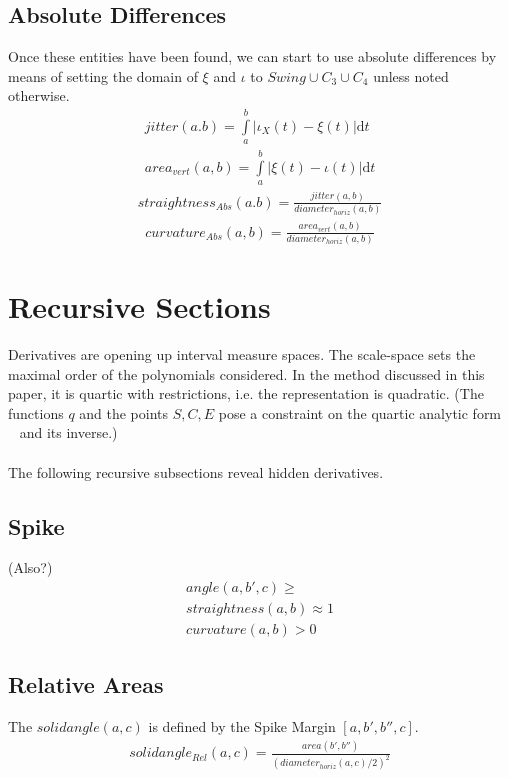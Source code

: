 \documentclass{report}
\begin{document}
\subsection*{Absolute Differences}
Once these entities have been found, we can start to use absolute differences by means of setting the domain of $\xi$ and $\iota$ to $Swing \cup C_{3} \cup C_{4}$ unless noted otherwise.
\begin{align}
jitter(a.b)=\int \limits _{a}^{b}\lvert \iota_{X}(t) - \xi(t) \rvert \mathrm{d}t\\
area_{vert}(a,b)=\int \limits _{a}^{b} \lvert \xi(t)-\iota(t) \rvert \mathrm{d}t
\end{align}
\begin{align}
straightness_{Abs}(a.b)=\frac{jitter(a,b)}{diameter_{horiz}(a,b)}
\end{align}
\begin{align}
curvature_{Abs}(a,b) = \frac{area_{vert}(a,b)}{diameter_{horiz}(a,b)}
\end{align}

\section{Recursive Sections}
Derivatives are opening up interval measure spaces. The scale-space sets the maximal order of the polynomials considered. In the method discussed in this paper, it is quartic with restrictions, i.e. the representation is quadratic.  (The functions $q$ and the points $S,C,E$ pose a constraint on the quartic analytic form ~\cite[Spline\_CharacteristicPolynomials.nb]{Axioms} and its inverse.)\\\\
The following recursive subsections reveal hidden derivatives.

\subsection{Spike}
(Also?)
\begin{align}
angle(a,b',c)\geq\\
straightness(a,b)\approx 1\\
curvature(a,b)>0
\end{align}

\subsection{Relative Areas}
The $solidangle(a,c)$ is defined by the Spike Margin $[a,b',b'',c]$.
\begin{align}
solidangle_{Rel}(a,c) = \frac{area(b',b'')}{(diameter_{horiz}(a,c)/2)^2}
\end{align}
\end{document}
